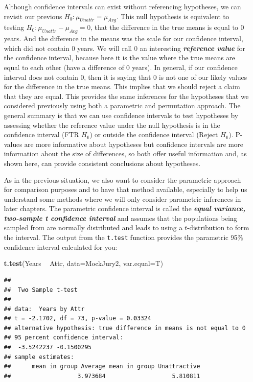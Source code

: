 \documentclass[]{book}
\newenvironment{Shaded}{\begin{snugshade}}{\end{snugshade}}
\newcommand{\KeywordTok}[1]{\textcolor[rgb]{0.13,0.29,0.53}{\textbf{#1}}}
\newcommand{\DataTypeTok}[1]{\textcolor[rgb]{0.13,0.29,0.53}{#1}}
\newcommand{\StringTok}[1]{\textcolor[rgb]{0.31,0.60,0.02}{#1}}
\newcommand{\OperatorTok}[1]{\textcolor[rgb]{0.81,0.36,0.00}{\textbf{#1}}}
\newcommand{\NormalTok}[1]{#1}
\begin{document}
Although confidence intervals can exist without referencing hypotheses,
we can revisit our previous \(H_0: \mu_{Unattr} = \mu_{Avg}\). This null
hypothesis is equivalent to testing
\(H_0: \mu_{Unattr} - \mu_{Avg} = 0\), that the difference in the true
means is equal to 0 years. And the difference in the means was the scale
for our confidence interval, which did not contain 0 years. We will call
0 an interesting \textbf{\emph{reference value}} for the confidence
interval, because here it is the value where the true means are equal to
each other (have a difference of 0 years). In general, if our confidence
interval does not contain 0, then it is saying that 0 is not one of our
likely values for the difference in the true means. This implies that we
should reject a claim that they are equal. This provides the same
inferences for the hypotheses that we considered previously using both a
parametric and permutation approach. The general summary is that we can
use confidence intervals to test hypotheses by assessing whether the
reference value under the null hypothesis is in the confidence interval
(FTR \(H_0\)) or outside the confidence interval (Reject \(H_0\)).
P-values are more informative about hypotheses but confidence intervals
are more information about the size of differences, so both offer useful
information and, as shown here, can provide consistent conclusions about
hypotheses.

As in the previous situation, we also want to consider the parametric
approach for comparison purposes and to have that method available,
especially to help us understand some methods where we will only
consider parametric inferences in later chapters. The parametric
confidence interval is called the \textbf{\emph{equal variance,
two-sample t confidence interval}} and assumes that the populations
being sampled from are normally distributed and leads to using a
\(t\)-distribution to form the interval. The output from the
\texttt{t.test} function provides the parametric 95\% confidence
interval calculated for you:

\begin{Shaded}
\begin{Highlighting}[]
\KeywordTok{t.test}\NormalTok{(Years }\OperatorTok{~}\StringTok{ }\NormalTok{Attr, }\DataTypeTok{data=}\NormalTok{MockJury2, }\DataTypeTok{var.equal=}\NormalTok{T)}
\end{Highlighting}
\end{Shaded}

\begin{verbatim}
## 
##  Two Sample t-test
## 
## data:  Years by Attr
## t = -2.1702, df = 73, p-value = 0.03324
## alternative hypothesis: true difference in means is not equal to 0
## 95 percent confidence interval:
##  -3.5242237 -0.1500295
## sample estimates:
##      mean in group Average mean in group Unattractive 
##                   3.973684                   5.810811
\end{verbatim}
\end{document}

